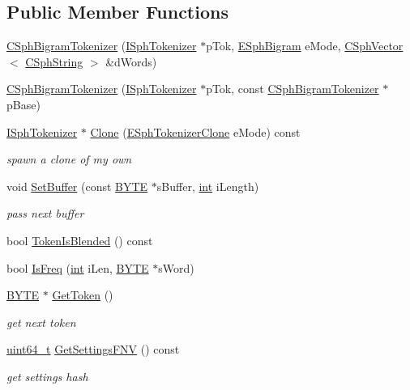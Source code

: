 \subsection*{Public Member Functions}
\begin{DoxyCompactItemize}
\item 
\hyperlink{classCSphBigramTokenizer_aceeeb2e49a681575010e563d4d1bf33a}{C\-Sph\-Bigram\-Tokenizer} (\hyperlink{classISphTokenizer}{I\-Sph\-Tokenizer} $\ast$p\-Tok, \hyperlink{sphinx_8h_a4900146967791908ab838925add48e43}{E\-Sph\-Bigram} e\-Mode, \hyperlink{classCSphVector}{C\-Sph\-Vector}$<$ \hyperlink{structCSphString}{C\-Sph\-String} $>$ \&d\-Words)
\item 
\hyperlink{classCSphBigramTokenizer_ae7ffbf890b1ef03fe12029227929f803}{C\-Sph\-Bigram\-Tokenizer} (\hyperlink{classISphTokenizer}{I\-Sph\-Tokenizer} $\ast$p\-Tok, const \hyperlink{classCSphBigramTokenizer}{C\-Sph\-Bigram\-Tokenizer} $\ast$p\-Base)
\item 
\hyperlink{classISphTokenizer}{I\-Sph\-Tokenizer} $\ast$ \hyperlink{classCSphBigramTokenizer_ae52f7c3b214e1593abd470e102f0150f}{Clone} (\hyperlink{sphinx_8h_adc6a6e1ffce224f14950be604087978c}{E\-Sph\-Tokenizer\-Clone} e\-Mode) const 
\begin{DoxyCompactList}\small\item\em spawn a clone of my own \end{DoxyCompactList}\item 
void \hyperlink{classCSphBigramTokenizer_a670f40c1fdc2fb057ddcd0636f4a3c9d}{Set\-Buffer} (const \hyperlink{sphinxstd_8h_a4ae1dab0fb4b072a66584546209e7d58}{B\-Y\-T\-E} $\ast$s\-Buffer, \hyperlink{sphinxexpr_8cpp_a4a26e8f9cb8b736e0c4cbf4d16de985e}{int} i\-Length)
\begin{DoxyCompactList}\small\item\em pass next buffer \end{DoxyCompactList}\item 
bool \hyperlink{classCSphBigramTokenizer_ab6c85268d6c4b6610d3349c2be64c1df}{Token\-Is\-Blended} () const 
\item 
bool \hyperlink{classCSphBigramTokenizer_a06c1852b5a5c20854e8be294502f5b97}{Is\-Freq} (\hyperlink{sphinxexpr_8cpp_a4a26e8f9cb8b736e0c4cbf4d16de985e}{int} i\-Len, \hyperlink{sphinxstd_8h_a4ae1dab0fb4b072a66584546209e7d58}{B\-Y\-T\-E} $\ast$s\-Word)
\item 
\hyperlink{sphinxstd_8h_a4ae1dab0fb4b072a66584546209e7d58}{B\-Y\-T\-E} $\ast$ \hyperlink{classCSphBigramTokenizer_ab0fa4224967186e7d2595bd50c994029}{Get\-Token} ()
\begin{DoxyCompactList}\small\item\em get next token \end{DoxyCompactList}\item 
\hyperlink{sphinxstd_8h_aaa5d1cd013383c889537491c3cfd9aad}{uint64\-\_\-t} \hyperlink{classCSphBigramTokenizer_aac43c456e1aff3b46036241c530711f2}{Get\-Settings\-F\-N\-V} () const 
\begin{DoxyCompactList}\small\item\em get settings hash \end{DoxyCompactList}\end{DoxyCompactItemize}

